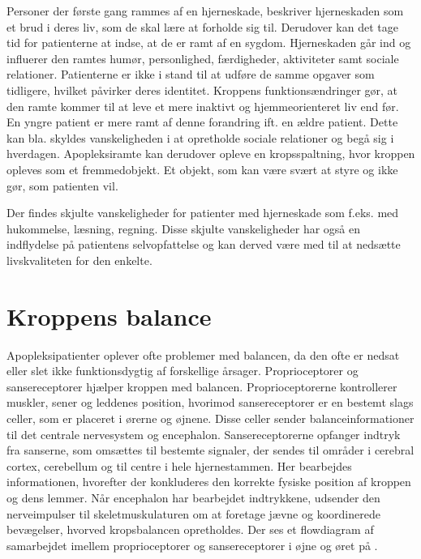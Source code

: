 Personer der første gang rammes af en hjerneskade, beskriver hjerneskaden som et brud i deres liv, som de skal lære at forholde sig til. Derudover kan det tage tid for patienterne at indse, at de er ramt af en sygdom. Hjerneskaden går ind og influerer den ramtes humør, personlighed, færdigheder, aktiviteter samt sociale relationer. Patienterne er ikke i stand til at udføre de samme opgaver som tidligere, hvilket påvirker deres identitet. Kroppens funktionsændringer gør, at den ramte kommer til at leve et mere inaktivt og hjemmeorienteret liv end før. En yngre patient er mere ramt af denne forandring ift. en ældre patient. Dette kan bla. skyldes vanskeligheden i at opretholde sociale relationer og begå sig i hverdagen. Apopleksiramte kan derudover opleve en kropsspaltning, hvor kroppen opleves som et fremmedobjekt. Et objekt, som kan være svært at styre og ikke gør, som patienten vil. \cite{Sundhedsstyrelsen2010}

Der findes skjulte vanskeligheder for patienter med hjerneskade som f.eks. med hukommelse, læsning, regning. Disse skjulte vanskeligheder har også en indflydelse på patientens selvopfattelse og  kan derved være med til at nedsætte livskvaliteten for den enkelte. \cite{Sundhedsstyrelsen2010} 

\chapter{Kroppens balance}\label{app-Balance}
Apopleksipatienter oplever ofte problemer med balancen, da den ofte er nedsat eller slet ikke funktionsdygtig af forskellige årsager. \cite{Karnath2003} Proprioceptorer og sansereceptorer hjælper kroppen med balancen. Proprioceptorerne kontrollerer muskler, sener og leddenes position, hvorimod sansereceptorer er en bestemt slags celler, som er placeret i ørerne og øjnene. \cite{Martini2012} Disse celler sender balanceinformationer til det centrale nervesystem og encephalon. Sansereceptorerne opfanger indtryk fra sanserne, som omsættes til bestemte signaler, der sendes til områder i cerebral cortex, cerebellum og til centre i hele hjernestammen. Her bearbejdes informationen, hvorefter der konkluderes den korrekte fysiske position af kroppen og dens lemmer. Når encephalon har bearbejdet indtrykkene, udsender den nerveimpulser til skeletmuskulaturen om at foretage jævne og koordinerede bevægelser, hvorved kropsbalancen opretholdes.\cite{Martini2012} Der ses et flowdiagram af samarbejdet imellem proprioceptorer og sansereceptorer i øjne og øret på .

